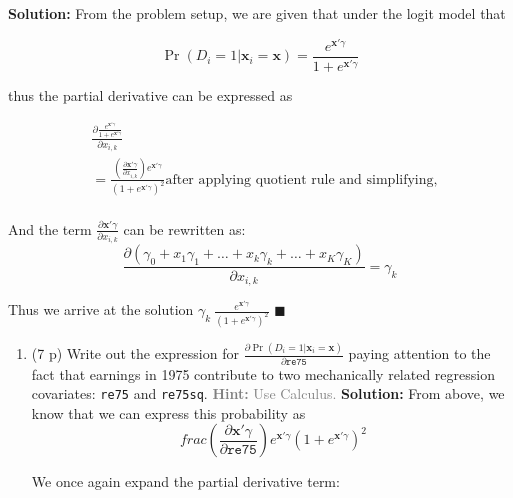 \documentclass[
]{article}
\begin{document}
\begin{enumerate}
\begin{enumerate}
\begin{enumerate}
      \textbf{Solution:} From the problem setup, we are given that under
      the logit model that

      \[
           \Pr(D_i=1|\mathbf{x}_{i}=\mathbf{x}) = \frac{e^{\mathbf{x}'\gamma}}{1+ e^{\mathbf{x}'\gamma}}
       \]

      thus the partial derivative can be expressed as

      \begin{align*}
           &\frac{\partial \frac{e^{\mathbf{x}'\gamma}}{1+ e^{\mathbf{x}'\gamma}}}{\partial x_{i,k}} \\
           &= \frac{\left(\frac{\partial \mathbf{x}'\gamma}{\partial x_{i, k}}\right)e^{\mathbf{x}'\gamma}}{\left(1 + e^{\mathbf{x}'\gamma}\right)^2} \text{after applying quotient rule and simplifying}, \\
       \end{align*}

      And the term
      \(\frac{\partial \mathbf{x}'\gamma}{\partial x_{i, k}}\) can be
      rewritten as: \[
           \frac{\partial (\gamma_0 + x_1 \gamma_1 + \ldots + x_k\gamma_k + \ldots + x_K\gamma_K)}{\partial x_{i, k}} = \gamma_k
       \]

      Thus we arrive at the solution
      \(\gamma_k \ \frac{e^{\mathbf{x}'\gamma}}{\left(1 + e^{\mathbf{x}'\gamma}\right)^2}\)
      \hfill \(\blacksquare\)
    \end{enumerate}

    \newpage

    \begin{enumerate}
    \def\labelenumiii{\roman{enumiii}.}
    \setcounter{enumiii}{1}
    \item
      (7 p) Write out the expression for
      \(\frac{\partial \Pr(D_i=1|\mathbf{x}_{i}=\mathbf{x})}{\partial \texttt{re75}}\)
      paying attention to the fact that earnings in 1975 contribute to
      two mechanically related regression covariates: \texttt{re75} and
      \texttt{re75sq}.
      \textcolor{gray}{\textbf{Hint:} Use Calculus.}\label{item:logit:delta-pscore-re75}
      \textbf{Solution:} From above, we know that we can express this
      probability as \[\
          frac{\left(\frac{\partial \mathbf{x}'\gamma}{\partial \texttt{re75}}\right)e^{\mathbf{x}'\gamma}}{\left(1 + e^{\mathbf{x}'\gamma}\right)^2}
      \]

      We once again expand the partial derivative term:


\end{enumerate}
\end{enumerate}
\end{enumerate}
\end{document}
